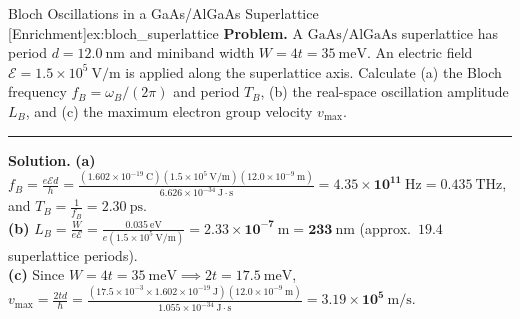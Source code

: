 \documentclass[11pt,a4paper]{article}
\newcommand{\hb}{\hbar}
\begin{document}
\begin{examplebox}{Bloch Oscillations in a GaAs/AlGaAs Superlattice \textnormal{\color{purple!75!black}[Enrichment]}}{ex:bloch_superlattice}
\textbf{Problem.} A $\text{GaAs}/\text{AlGaAs}$ superlattice has period $d = 12.0\ \mathrm{nm}$ and miniband width $W = 4t = 35\ \mathrm{meV}$. An electric field $\mathcal{E} = 1.5\times 10^5\ \mathrm{V/m}$ is applied along the superlattice axis. Calculate (a) the Bloch frequency $f_B = \omega_B/(2\pi)$ and period $T_B$, (b) the real-space oscillation amplitude $L_B$, and (c) the maximum electron group velocity $v_{\max}$.
\vspace{0.2cm}\hrule\vspace{0.2cm}
\textbf{Solution.}
\textbf{(a)} $f_B = \frac{e\mathcal{E}d}{h} = \frac{(1.602\times 10^{-19}\ \mathrm{C})(1.5\times 10^5\ \mathrm{V/m})(12.0\times 10^{-9}\ \mathrm{m})}{6.626\times 10^{-34}\ \mathrm{J\cdot s}} = \mathbf{4.35\times 10^{11}\ \mathrm{Hz} = 0.435\ \mathrm{THz}}$, and $T_B = \frac{1}{f_B} = \mathbf{2.30\ \mathrm{ps}}$.\\
\textbf{(b)} $L_B = \frac{W}{e\mathcal{E}} = \frac{0.035\ \mathrm{eV}}{e(1.5\times 10^5\ \mathrm{V/m})} = \mathbf{2.33\times 10^{-7}\ \mathrm{m} = 233\ \mathrm{nm}}$ (approx.\ $19.4$ superlattice periods).\\
\textbf{(c)} Since $W = 4t = 35\ \mathrm{meV} \implies 2t = 17.5\ \mathrm{meV}$, $v_{\max} = \frac{2td}{\hb} = \frac{(17.5\times 10^{-3}\times 1.602\times 10^{-19}\ \mathrm{J})(12.0\times 10^{-9}\ \mathrm{m})}{1.055\times 10^{-34}\ \mathrm{J\cdot s}} = \mathbf{3.19\times 10^5\ \mathrm{m/s}}$.
\end{examplebox}
\end{document}
